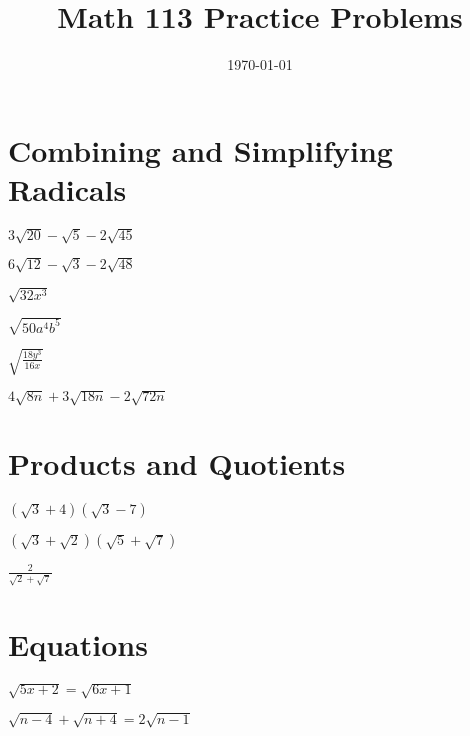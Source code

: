 \documentclass[fleqn,addpoints]{exam}
\title{Math 113 Practice Problems}
\author{}
\date{\today}
\begin{document}
\maketitle

\section{Combining and Simplifying Radicals}

\begin{questions}

\question \( \displaystyle 3 \sqrt{20} - \sqrt{5} - 2 \sqrt{45} \) 
\vspace{0.75 in}

\question \( \displaystyle 6 \sqrt{12} - \sqrt{3} - 2 \sqrt{48} \) 
\vspace{0.75 in}

\question \( \displaystyle \sqrt{32x^3} \) 
\vspace{0.75 in}

\question \( \displaystyle \sqrt{50a^4b^5} \) 
\vspace{0.75 in}

\question \( \displaystyle \sqrt{\frac{18y^3}{16x}} \) 
\vspace{0.75 in}

\question \( \displaystyle 4 \sqrt{8n} + 3 \sqrt{18n} - 2 \sqrt{72n} \) 
\vspace{0.75 in}

\pagebreak

\section{Products and Quotients}

\question \( \displaystyle (\sqrt{3} + 4)(\sqrt{3} - 7) \) 
\vspace{1 in}

\question \( \displaystyle (\sqrt{3} + \sqrt{2})(\sqrt{5} + \sqrt{7}) \) 
\vspace{1 in}

\question \( \displaystyle \frac{2}{\sqrt{2} + \sqrt{7}}\) 
\vspace{1 in}

\section{Equations}

\question \( \sqrt{5x+2} = \sqrt{6x+1} \) 
\vspace{1.5 in}

\question \( \sqrt{n-4} + \sqrt{n+4} = 2\sqrt{n-1} \) 
\vspace{1.5 in}

\end{questions}
\end{document}
